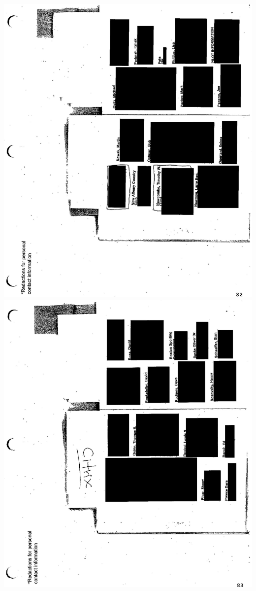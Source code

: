 \documentclass[10pt]{article}
\begin{document}
\includegraphics[max width=\textwidth, center]{2025_02_27_dd68c3d38de88f0516d9g-199}\\
\includegraphics[max width=\textwidth, center]{2025_02_27_dd68c3d38de88f0516d9g-200}\\
\end{document}
